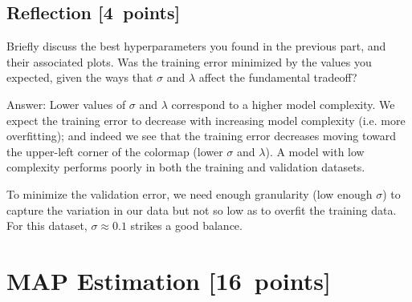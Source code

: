 \documentclass{article}
\newcommand{\blu}[1]{{\textcolor{blu}{#1}}}
\newenvironment{answer}{\par\begingroup\color{gre}Answer: }{\endgroup}
\let\ask\blu
\newcommand\pts[1]{\textcolor{pointscolour}{[#1~points]}}
\begin{document}
\subsection{Reflection \pts{4}}
\ask{
Briefly discuss the best hyperparameters you found in the previous part, and their associated plots. Was the training error minimized by the values you expected, given the ways that $\sigma$ and $\lambda$ affect the fundamental tradeoff?
}
\begin{answer}
    Lower values of $\sigma$ and $\lambda$ correspond to a higher model complexity. We expect the training error to decrease with increasing model complexity (i.e. more overfitting); and indeed we see that the training error decreases moving toward the upper-left corner of the colormap (lower $\sigma$ and $\lambda$). A model with low complexity performs poorly in both the training and validation datasets.

    To minimize the validation error, we need enough granularity (low enough $\sigma$) to capture the variation in our data but not so low as to overfit the training data. For this dataset, $\sigma \approx 0.1$ strikes a good balance.
\end{answer}

\clearpage
\section{MAP Estimation \pts{16}}
\end{document}
